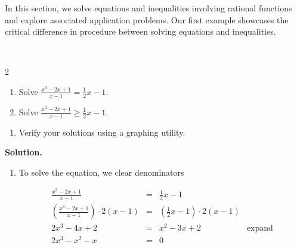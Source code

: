 \documentclass{ximera}
\begin{document}
	\author{Stitz-Zeager}




\setcounter{footnote}{0}

\label{RationalIneq}

In this section, we solve equations and inequalities involving rational functions and explore associated application problems. Our first example showcases the critical difference in procedure between solving equations and inequalities.

\begin{example} \label{rationalinequalityex}  $~$

\begin{multicols}{2}
\begin{enumerate}

\item  Solve $ \frac{x^3-2x+1}{x-1} =  \frac{1}{2}x-1$.

\item  Solve $ \frac{x^3-2x+1}{x-1} \geq  \frac{1}{2}x-1$.

\setcounter{HW}{\value{enumi}}
\end{enumerate}
\end{multicols}

\begin{enumerate}
\setcounter{enumi}{\value{HW}}

\item  Verify your solutions using a graphing utility.

\end{enumerate}

{ \bf Solution.} 

\begin{enumerate}

\item  To solve the equation, we clear denominators

\[ \begin{array}{rclr}

 \frac{x^3-2x+1}{x-1} & = &  \frac{1}{2}x-1 & \\  

\left( \frac{x^3-2x+1}{x-1}\right) \cdot 2(x-1) & = & \left(  \frac{1}{2}x-1 \right) \cdot 2(x-1) & \\  

2x^3 - 4x + 2 & = & x^2-3x+2 & \text{expand} \\

2x^3 -x^2 - x & = & 0 & \\


\end{array}\]
\end{enumerate}
\end{example}
\end{document}
